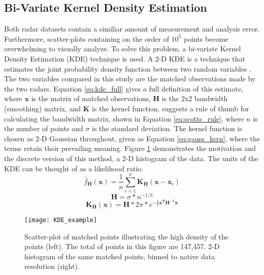 \subsection{Bi-Variate Kernel Density Estimation}
Both radar datasets contain a similiar amount of measurement and analysis error. Furthermore, scatter-plots containing on the order of $10^5$ points become
overwhelming to visually analyze. To solve this problem, a bi-variate Kernel Density Estimation (KDE) technique is used. A 2-D KDE is a technique that
estimates the joint probability density function between two random variables \citep{Silverman1986}. The two variables compared in this study are the matched
observations made by the two radars. Equation \ref{eq:kde_full} gives a full definition of this estimate, where $\mathbf{x}$ is the matrix of matched
observations, $\mathbf{H}$ is the 2x2 bandwidth (smoothing) matrix, and $\mathbf{K}$ is the kernel function. \citet{Scott1992} suggests a rule of thumb for
calculating the bandwidth matrix, shown in Equation \ref{eq:scotts_rule}, where $n$ is the number of points and $\sigma$ is the standard deviation. The
kernel function is chosen as 2-D Gaussian throughout, given as Equation \ref{eq:gauss_kern}, where the terms retain their prevailing meaning. Figure
\ref{fig:KDE_example} demonstrates the motivation and the discrete version of this method, a 2-D histogram of the data. The units of the KDE can be thought
of as a likelihood ratio.
\\
\begin{equation}\label{eq:kde_full}
\hat{f}_{\mathbf{H}}(\mathbf{x}) = \frac{1}{n} \sum_{i=1}^{n} \mathbf{K_H}(\mathbf{x} - \mathbf{x}_i)
\end{equation}
\begin{equation}\label{eq:scotts_rule}
\mathbf{H} = \sigma * n^{-1/3}
\end{equation}
\begin{equation}\label{eq:gauss_kern}
\mathbf{K_H}(\textbf{x}) = \mathbf{H} * 2\pi * e^{-\frac{1}{2} \mathbf{x^T} \mathbf{H^{-1}} \mathbf{x}}
\end{equation}
\begin{figure}
\texttt{[image: KDE\_example]}\centering
\caption{Scatter-plot of matched points illustrating the high density of the points (left). The total of points in this figure are 147,457. 2-D histogram of
the same matched points, binned to native data resolution (right).} 
\label{fig:KDE_example}
\end{figure}

